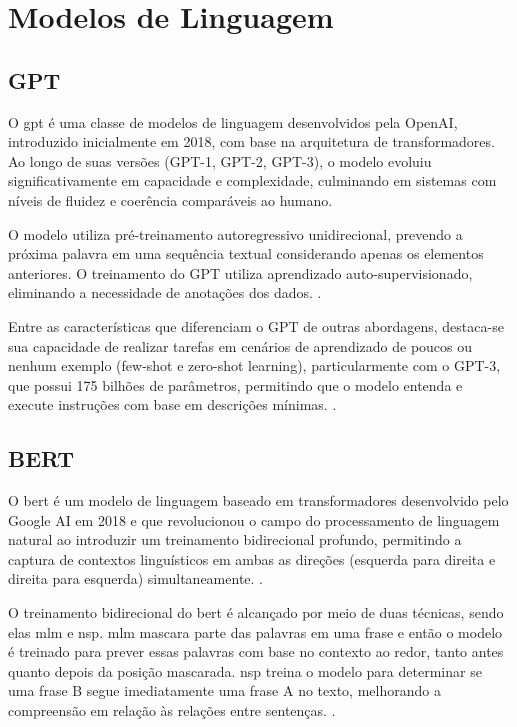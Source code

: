 \section{Modelos de Linguagem}\label{sec:modelos}

\subsection{GPT}\label{subsec:gpt}

O \gls{gpt} é uma classe de modelos de linguagem desenvolvidos pela OpenAI, introduzido inicialmente em 2018, com base na arquitetura de transformadores. Ao longo de suas versões (GPT-1, GPT-2, GPT-3), o modelo evoluiu significativamente em capacidade e complexidade, culminando em sistemas com níveis de fluidez e coerência comparáveis ao humano.

O modelo utiliza pré-treinamento autoregressivo unidirecional, prevendo a próxima palavra em uma sequência textual considerando apenas os elementos anteriores. O treinamento do GPT utiliza aprendizado auto-supervisionado, eliminando a necessidade de anotações dos dados. \cite{Brown2020}.

Entre as características que diferenciam o GPT de outras abordagens, destaca-se sua capacidade de realizar tarefas em cenários de aprendizado de poucos ou nenhum exemplo (few-shot e zero-shot learning), particularmente com o GPT-3, que possui 175 bilhões de parâmetros, permitindo que o modelo entenda e execute instruções com base em descrições mínimas. \cite{Brown2020}.

\subsection{BERT}\label{subsec:bert}

O \gls{bert} é um modelo de linguagem baseado em transformadores desenvolvido pelo Google AI em 2018 e que revolucionou o campo do processamento de linguagem natural ao introduzir um treinamento bidirecional profundo, permitindo a captura de contextos linguísticos em ambas as direções (esquerda para direita e direita para esquerda) simultaneamente. \cite{Devlin2018}.

O treinamento bidirecional do \gls{bert} é alcançado por meio de duas técnicas, sendo elas \gls{mlm} e \gls{nsp}. \gls{mlm} mascara parte das palavras em uma frase e então o modelo é treinado para prever essas palavras com base no contexto ao redor, tanto antes quanto depois da posição mascarada. \gls{nsp} treina o modelo para determinar se uma frase B segue imediatamente uma frase A no texto, melhorando a compreensão em relação às relações entre sentenças. \cite{Devlin2018}.

